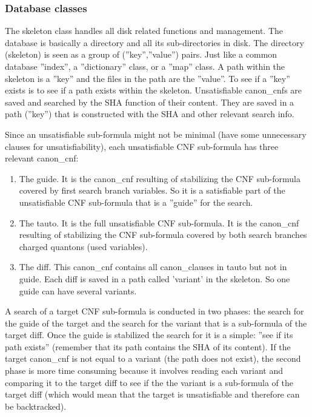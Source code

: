 \documentclass{easychair}
\newcommand{\quanton}{\textsf{quanton}}
\newcommand{\canoncnf}{\textsf{canon\_cnf}}
\newcommand{\canonclause}{\textsf{canon\_clause}}
\newcommand{\skeleton}{\textsf{skeleton}}
\begin{document}
\subsubsection{Database classes}

The {\skeleton} class handles all disk related functions and management. The database is basically a directory and all its sub-directories in disk. The directory ({\skeleton}) is seen as a group of (''key'',''value'') pairs. Just like a common database ''index'', a ''dictionary'' class, or a ''map'' class. A path within the {\skeleton} is a ''key'' and the files in the path are the ''value''. To see if a ''key'' exists is to see if a path exists within the {\skeleton}. Unsatisfiable {\canoncnf}s are saved and searched by the SHA function of their content. They are saved in a path (''key'') that is constructed with the SHA and other relevant search info. 

Since an unsatisfiable sub-formula might not be minimal (have some unnecessary clauses for unsatisfiability), each unsatisfiable CNF sub-formula has three relevant {\canoncnf}: 

\begin{enumerate}
\item
The guide. It is the {\canoncnf} resulting of stabilizing the CNF sub-formula covered by first search branch variables. So it is a satisfiable part of the unsatisfiable CNF sub-formula that is a ''guide'' for the search.

\item
The tauto. It is the full unsatisfiable CNF sub-formula. It is the {\canoncnf} resulting of stabilizing the CNF sub-formula covered by both search branches charged {\quanton}s (used variables). 

\item
The diff. This {\canoncnf} contains all {\canonclause}s in tauto but not in guide. Each diff is saved in a path called 'variant' in the {\skeleton}. So one guide can have several variants. 
\end{enumerate}

A search of a target CNF sub-formula is conducted in two phases: the search for the guide of the target and the search for the variant that is a sub-formula of the target diff. Once the guide is stabilized the search for it is a simple: ''see if its path exists'' (remember that its path contains the SHA of its content). If the target {\canoncnf} is not equal to a variant (the path does not exist), the second phase is more time consuming because it involves reading each variant and comparing it to the target diff to see if the the variant is a sub-formula of the target diff (which would mean that the target is unsatisfiable and therefore can be backtracked).
\end{document}
